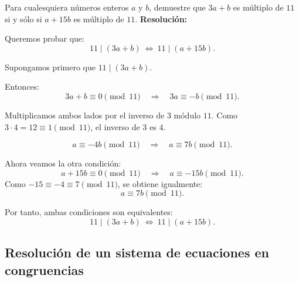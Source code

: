 \documentclass[a4paper,12pt]{article}
\begin{document}
\begin{ejercicio}[title=Ejercicio 36]
Para cualesquiera números enteros $a$ y $b$, demuestre que $3a + b$ es múltiplo de $11$
si y sólo si $a + 15b$ es múltiplo de $11$.
\tcblower
\textbf{Resolución:}

Queremos probar que:
\[
11 \mid (3a + b) \ \Leftrightarrow \ 11 \mid (a + 15b).
\]

\vspace{0.5em}

Supongamos primero que $11 \mid (3a + b)$.

Entonces:
\[
3a + b \equiv 0 \pmod{11} \quad \Rightarrow \quad 3a \equiv -b \pmod{11}.
\]

Multiplicamos ambos lados por el inverso de $3$ módulo $11$.
Como $3 \cdot 4 = 12 \equiv 1 \pmod{11}$, el inverso de $3$ es $4$.

\[
a \equiv -4b \pmod{11} \quad \Rightarrow \quad a \equiv 7b \pmod{11}.
\]

\vspace{0.5em}

Ahora veamos la otra condición:
\[
a + 15b \equiv 0 \pmod{11} \quad \Rightarrow \quad a \equiv -15b \pmod{11}.
\]
Como $-15 \equiv -4 \equiv 7 \pmod{11}$, se obtiene igualmente:
\[
a \equiv 7b \pmod{11}.
\]

Por tanto, ambas condiciones son equivalentes:
\[
\boxed{11 \mid (3a + b) \ \Leftrightarrow \ 11 \mid (a + 15b).}
\]

\end{ejercicio}

\subsection{Resolución de un sistema de ecuaciones en congruencias}
\end{document}
